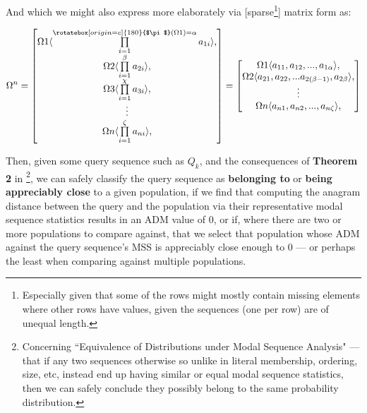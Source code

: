 \documentclass[a4paper, 18pt]{book} %
\newcommand{\invpi}{\rotatebox[origin=c]{180}{$\pi$}}
\begin{document}
And which we might also express more elaborately via [sparse\footnote{Especially given that some of the rows might mostly contain missing elements where other rows have values, given the sequences (one per row) are of unequal length.}] matrix form as:

\vspace{1em}
\begin{multline}
 \Omega^n = 
 \begin{bmatrix}
 \Omega1 \langle \prod\limits_{i=1}^{\invpi(\Omega 1) = \alpha} a_{1i} \rangle,\\
  \Omega2 \langle \prod\limits_{i=1}^{\beta} a_{2i} \rangle,\\
   \Omega3 \langle \prod\limits_{i=1}^{\chi} a_{3i} \rangle,\\
   \vdots \\
   \Omega n \langle \prod\limits_{i=1}^{\zeta} a_{ni} \rangle,\\
 \end{bmatrix} =
 \begin{bmatrix}
 \Omega1 \langle a_{11},a_{12},...,a_{1\alpha} \rangle,\\
   \Omega2 \langle a_{21},a_{22},...a_{2(\beta-1)} ,a_{2\beta} \rangle,\\
   \vdots \\
     \Omega n \langle a_{n1},a_{n2},...,a_{n\zeta} \rangle,\\
 \end{bmatrix}
\end{multline}
\vspace{1em}


Then, given some query sequence such as $Q_k$, and the consequences of \textbf{Theorem 2} in \cite{transformatics}\footnote{Concerning ``Equivalence of Distributions under Modal Sequence
Analysis" --- that if any two sequences otherwise so unlike in literal membership, ordering, size, etc, instead end up having similar or equal modal sequence statistics, then we can safely conclude they possibly belong to the same probability distribution.}, we can safely classify the query sequence as \textbf{belonging to} or \textbf{being appreciably close} to a given population, if we find that computing the anagram distance between the query and the population via their representative modal sequence statistics results in an ADM value of 0, or if, where there are two or more populations to compare against, that we select that population whose ADM against the query sequence's MSS is appreciably close enough to 0 --- or perhaps the least when comparing against multiple populations.
\end{document}
